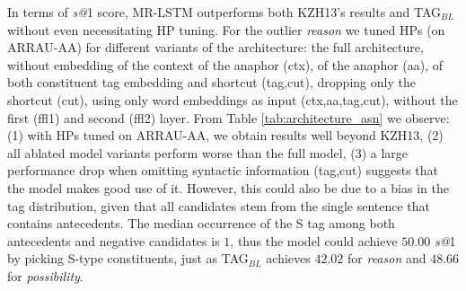 \documentclass[11pt,letterpaper]{article}
\begin{document}
In terms of \textit{s@}1 score, MR-LSTM outperforms both KZH13's results and TAG$_{BL}$ without even necessitating HP tuning. For the outlier \textit{reason} we tuned HPs (on ARRAU-AA) for different variants of the architecture: the full architecture, without embedding of the context of the anaphor (ctx), of the anaphor (aa), of both constituent tag embedding and shortcut (tag,cut), dropping only the shortcut (cut), using only word embeddings as input 
(ctx,aa,tag,cut),  without the first (ffl1) and second (ffl2) layer. From Table \ref{tab:architecture_asn} we observe:
(1) with HPs tuned on ARRAU-AA, we obtain results well beyond KZH13, (2) all ablated model variants perform worse than the full model, (3) a large performance drop when omitting syntactic information (tag,cut) suggests that the model makes good use of it. However, this could also be due to a
bias in the tag distribution, given that all candidates stem from the single sentence that contains antecedents. The median occurrence of the S tag among both antecedents and negative candidates is $1$, thus the model could achieve $50.00$ \textit{s@}1 by picking S-type constituents, just as TAG$_{BL}$ achieves $42.02$ for \textit{reason} and 
$48.66$ for \textit{possibility}.
\end{document}
